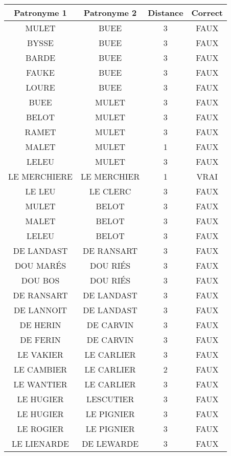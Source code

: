 \small
\begin{center}
    
    \begin{longtable}{|c|c|c|c|}
        \hline	Patronyme 1	&	Patronyme 2	&	Distance	&	Correct	\\
\hline
\hline	MULET	&	BUEE	&	3	&	FAUX	\\
\hline	BYSSE	&	BUEE	&	3	&	FAUX	\\
\hline	BARDE	&	BUEE	&	3	&	FAUX	\\
\hline	FAUKE	&	BUEE	&	3	&	FAUX	\\
\hline	LOURE	&	BUEE	&	3	&	FAUX	\\
\hline	BUEE	&	MULET	&	3	&	FAUX	\\
\hline	BELOT	&	MULET	&	3	&	FAUX	\\
\hline	RAMET	&	MULET	&	3	&	FAUX	\\
\hline	MALET	&	MULET	&	1	&	FAUX	\\
\hline	LELEU	&	MULET	&	3	&	FAUX	\\
\hline	LE MERCHIERE	&	LE MERCHIER	&	1	&	VRAI	\\
\hline	LE LEU	&	LE CLERC	&	3	&	FAUX	\\
\hline	MULET	&	BELOT	&	3	&	FAUX	\\
\hline	MALET	&	BELOT	&	3	&	FAUX	\\
\hline	LELEU	&	BELOT	&	3	&	FAUX	\\
\hline	DE LANDAST	&	DE RANSART	&	3	&	FAUX	\\
\hline	DOU MARÉS	&	DOU RIÉS	&	3	&	FAUX	\\
\hline	DOU BOS	&	DOU RIÉS	&	3	&	FAUX	\\
\hline	DE RANSART	&	DE LANDAST	&	3	&	FAUX	\\
\hline	DE LANNOIT	&	DE LANDAST	&	3	&	FAUX	\\
\hline	DE HERIN	&	DE CARVIN	&	3	&	FAUX	\\
\hline	DE FERIN	&	DE CARVIN	&	3	&	FAUX	\\
\hline	LE VAKIER	&	LE CARLIER	&	3	&	FAUX	\\
\hline	LE CAMBIER	&	LE CARLIER	&	2	&	FAUX	\\
\hline	LE WANTIER	&	LE CARLIER	&	3	&	FAUX	\\
\hline	LE HUGIER	&	LESCUTIER	&	3	&	FAUX	\\
\hline	LE HUGIER	&	LE PIGNIER	&	3	&	FAUX	\\
\hline	LE ROGIER	&	LE PIGNIER	&	3	&	FAUX	\\
\hline	LE LIENARDE	&	DE LEWARDE	&	3	&	FAUX	\\

\end{longtable}
\end{center}
